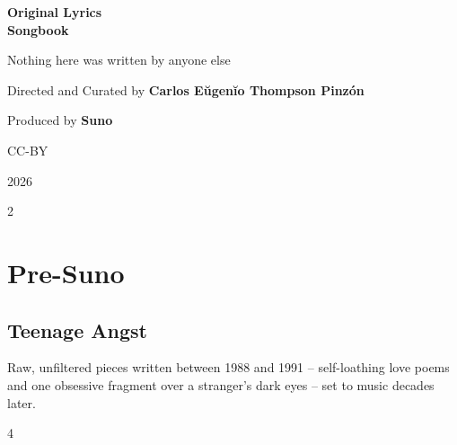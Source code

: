 \documentclass[a4paper,landscape]{memoir}
\begin{document}
\frontmatter
{}

\begin{titlingpage}
\centering
\vspace*{\fill}
{\LARGE\bfseries Original Lyrics\\\Huge Songbook\par}
\bigskip
{\large Nothing here was written by anyone else\par}
\vspace*{\fill}
{\normalsize Directed and Curated by \bfseries Carlos Eŭgenĭo Thompson Pinzón\par}
{\normalsize Produced by \bfseries Suno\par}
\bigskip
{\normalsize CC-BY\par}
{\normalsize 2026\par}
\vspace*{\fill}
\end{titlingpage}

\clearpage\begin{multicols*}{2}
\tableofcontents*
\end{multicols*}
\mainmatter
\renewcommand\chaptername{Album~}

\part{Pre-Suno}

\chapter{Teenage Angst}
Raw, unfiltered pieces written between 1988 and 1991 -- self-loathing love poems and one obsessive fragment over a stranger's dark eyes -- set to music decades later.
\clearpage\begin{multicols*}{4}











\end{multicols*}
\end{document}
